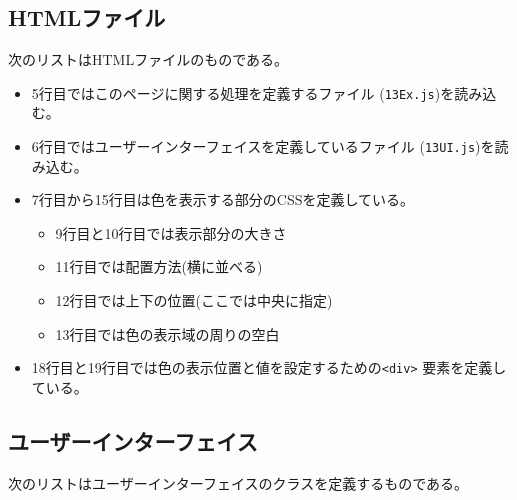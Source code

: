 \subsection{HTMLファイル}
次のリストはHTMLファイルのものである。
\begin{itemize}
 \item 5行目ではこのページに関する処理を定義する\JS ファイル
       (\texttt{13Ex.js})を読み込む。
 \item 6行目ではユーザーインターフェイスを定義している\JS ファイル
       (\texttt{13UI.js})を読み込む。
 \item 7行目から15行目は色を表示する部分のCSSを定義している。
       \begin{itemize}
        \item 9行目と10行目では表示部分の大きさ
        \item 11行目では配置方法(横に並べる)
        \item 12行目では上下の位置(ここでは中央に指定)
        \item 13行目では色の表示域の周りの空白
       \end{itemize}
 \item 18行目と19行目では色の表示位置と値を設定するための\texttt{<div>}
       要素を定義している。
\end{itemize}
 \subsection{ユーザーインターフェイス}
 次のリストはユーザーインターフェイスのクラスを定義するものである。

